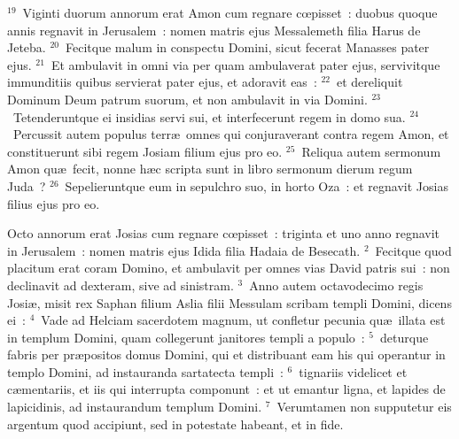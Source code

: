 ${}^{19}$~Viginti duorum annorum erat Amon cum regnare cœpisset~: duobus quoque annis regnavit in Jerusalem~: nomen matris ejus Messalemeth filia Harus de Jeteba.
${}^{20}$~Fecitque malum in conspectu Domini, sicut fecerat Manasses pater ejus.
${}^{21}$~Et ambulavit in omni via per quam ambulaverat pater ejus, servivitque immunditiis quibus servierat pater ejus, et adoravit eas~:
${}^{22}$~et dereliquit Dominum Deum patrum suorum, et non ambulavit in via Domini.
${}^{23}$~Tetenderuntque ei insidias servi sui, et interfecerunt regem in domo sua.
${}^{24}$~Percussit autem populus terr\ae\ omnes qui conjuraverant contra regem Amon, et constituerunt sibi regem Josiam filium ejus pro eo.
${}^{25}$~Reliqua autem sermonum Amon qu\ae\ fecit, nonne h\ae c scripta sunt in libro sermonum dierum regum Juda~?
${}^{26}$~Sepelieruntque eum in sepulchro suo, in horto Oza~: et regnavit Josias filius ejus pro eo.

\lettrine[lines=10,image=true,loversize=0.05,lraise=-0.03]{O}{}cto annorum erat Josias cum regnare cœpisset~: triginta et uno anno regnavit in Jerusalem~: nomen matris ejus Idida filia Hadaia de Besecath.
${}^{2}$~Fecitque quod placitum erat coram Domino, et ambulavit per omnes vias David patris sui~: non declinavit ad dexteram, sive ad sinistram.
${}^{3}$~Anno autem octavodecimo regis Josi\ae , misit rex Saphan filium Aslia filii Messulam scribam templi Domini, dicens ei~:
${}^{4}$~Vade ad Helciam sacerdotem magnum, ut confletur pecunia qu\ae\ illata est in templum Domini, quam collegerunt janitores templi a populo~:
${}^{5}$~deturque fabris per pr\ae positos domus Domini, qui et distribuant eam his qui operantur in templo Domini, ad instauranda sartatecta templi~:
${}^{6}$~tignariis videlicet et c\ae mentariis, et iis qui interrupta componunt~: et ut emantur ligna, et lapides de lapicidinis, ad instaurandum templum Domini.
${}^{7}$~Verumtamen non supputetur eis argentum quod accipiunt, sed in potestate habeant, et in fide.


